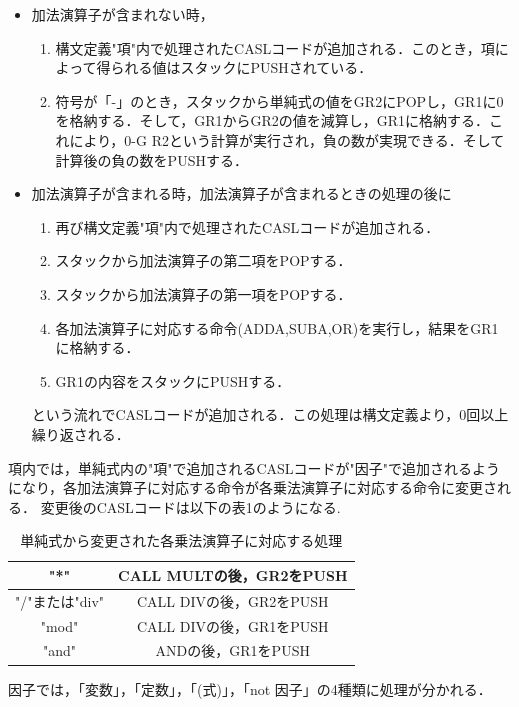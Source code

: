 \documentclass[dvipdfmx]{jarticle}
\begin{document}
  \begin{itemize}
    \item 加法演算子が含まれない時，
    \begin{enumerate}
      \item 構文定義"項"内で処理されたCASLコードが追加される．このとき，項によって得られる値はスタックにPUSHされている．
      \item 符号が「-」のとき，スタックから単純式の値をGR2にPOPし，GR1に0を格納する．そして，GR1からGR2の値を減算し，GR1に格納する．これにより，0-G
      R2という計算が実行され，負の数が実現できる．そして計算後の負の数をPUSHする．
    \end{enumerate}
    \item 加法演算子が含まれる時，加法演算子が含まれるときの処理の後に
    \begin{enumerate}
      \item 再び構文定義"項"内で処理されたCASLコードが追加される．
      \item スタックから加法演算子の第二項をPOPする．
      \item スタックから加法演算子の第一項をPOPする．
      \item 各加法演算子に対応する命令(ADDA,SUBA,OR)を実行し，結果をGR1に格納する．
      \item GR1の内容をスタックにPUSHする．
    \end{enumerate}
    という流れでCASLコードが追加される．この処理は構文定義より，0回以上繰り返される．
  \end{itemize}
  項内では，単純式内の"項"で追加されるCASLコードが"因子"で追加されるようになり，各加法演算子に対応する命令が各乗法演算子に対応する命令に変更される．
  変更後のCASLコードは以下の表1のようになる.
  \clearpage
  \begin{table}[h]
    \centering
    \begin{tabular}{|c||c|}
      \hline
      "*" & CALL MULTの後，GR2をPUSH\\\hline
      "/"または"div" & CALL DIVの後，GR2をPUSH\\\hline
      "mod" & CALL DIVの後，GR1をPUSH\\\hline
      "and" & ANDの後，GR1をPUSH\\\hline
    \end{tabular}
    \caption{単純式から変更された各乗法演算子に対応する処理}
  \end{table}
  因子では，「変数」，「定数」，「(式)」，「not 因子」の4種類に処理が分かれる．
\end{document}
